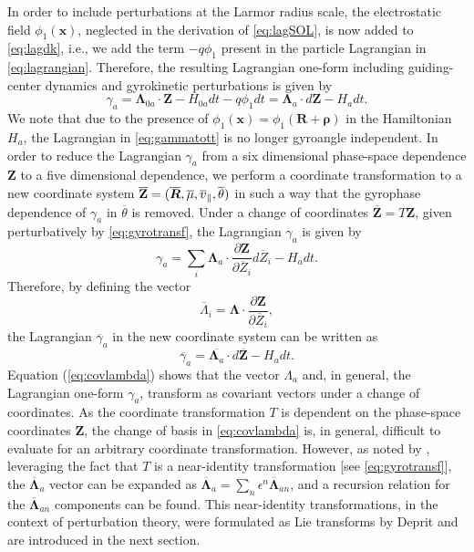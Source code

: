 In order to include perturbations at the Larmor radius scale, the electrostatic field $\phi_1(\mathbf x)$, neglected in the derivation of \cref{eq:lagSOL}, is now added to \cref{eq:lagdk}, i.e., we add the term $-q \phi_1$ present in the  particle Lagrangian in \cref{eq:lagrangian}.
%
Therefore, the resulting Lagrangian one-form including guiding-center dynamics and gyrokinetic perturbations is given by
%
\begin{equation}
    \gamma_a = \mathbf \Lambda_{0a} \cdot \mathbf Z-H_{0a} dt-q \phi_1 dt=\mathbf \Lambda_a \cdot d \mathbf Z - H_a dt.
\label{eq:gammatott}
\end{equation}
%
We note that due to the presence of $\phi_1(\mathbf x)=\phi_1(\mathbf R + \mathbf \rho)$ in the Hamiltonian $H_a$, the Lagrangian in \cref{eq:gammatott} is no longer gyroangle independent.
%
In order to reduce the Lagrangian $\gamma_a$ from a six dimensional phase-space dependence $\mathbf Z$ to a five dimensional dependence, we perform a coordinate transformation to a new coordinate system $\overline{\mathbf Z}=(\overline{\bm{R}},\overline{\mu},\overline{v}_{\parallel},\overline{\theta})$ in such a way that the gyrophase dependence of $\gamma_a$ in $\overline \theta$ is removed.
%
Under a change of coordinates $\overline{\mathbf Z}= T \mathbf Z$, given perturbatively by \cref{eq:gyrotransf}, the Lagrangian $\gamma_a$ is given by
%
\begin{equation}
    \gamma_a = \sum_i \mathbf \Lambda_a \cdot \frac{\partial \mathbf Z}{\partial \overline{ Z}_i} d \overline{ Z}_i-H_a dt.
\end{equation}
%
Therefore, by defining the vector
%
\begin{equation}
    \overline{\Lambda}_i= \mathbf \Lambda \cdot \frac{\partial \mathbf Z}{\partial \overline{ Z}_i},
\label{eq:covlambda}
\end{equation}
%
the Lagrangian $\overline \gamma_a$ in the new coordinate system can be written as
%
\begin{equation}
    \overline \gamma_a = \overline{\mathbf \Lambda_a}\cdot d \overline{\mathbf Z}-H_a dt.
\label{eq:ovgamma}
\end{equation}
%
Equation (\ref{eq:covlambda}) shows that the vector $\Lambda_a$ and, in general, the Lagrangian one-form $\gamma_a$, transform as covariant vectors under a change of coordinates.
%
As the coordinate transformation $T$ is dependent on the phase-space coordinates $\mathbf Z$, the change of basis in \cref{eq:covlambda} is, in general, difficult to evaluate for an arbitrary coordinate transformation.
%
However, as noted by \citet{Deprit1969}, leveraging the fact that $T$ is a near-identity transformation [see \cref{eq:gyrotransf}], the $\overline{\mathbf \Lambda}_a$ vector can be expanded as $\overline{\mathbf \Lambda}_a=\sum_n \epsilon^n \overline{\mathbf \Lambda}_{an}$, and a recursion relation for the $\overline{\mathbf \Lambda}_{an}$ components can be found.
%
This near-identity transformations, in the context of perturbation theory, were formulated as Lie transforms by Deprit and are introduced in the next section.

